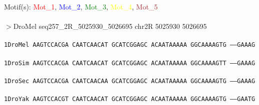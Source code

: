 \documentclass[11pt,twoside,reqno,a4paper]{article}
\begin{document}
\noindent
\newlength{\charwidth}Motif(s): \textcolor{Red}{Mot\_1}, \textcolor{Blue}{Mot\_2}, \textcolor{Green}{Mot\_3}, \textcolor{Yellow}{Mot\_4}, \textcolor{Brown}{Mot\_5}\\
\\
$>$DroMel	seq257\_2R\_5025930\_5026695	chr2R	5025930	5026695 \\
 \\
\texttt{1\hspace*{4\charwidth}DroMel	AAGTCCACGA	CAATCAACAT	GCATCGGAGC	ACAATAAAAA	GGCAAAAGTG	-----GAAAG	\\
\hspace*{5\charwidth}\hspace*{7\charwidth}\hspace*{1\charwidth}\hspace*{1\charwidth}\hspace*{1\charwidth}\hspace*{1\charwidth}\hspace*{1\charwidth}\hspace*{1\charwidth}\\
1\hspace*{4\charwidth}DroSim	AAGTCCACGA	CAATCAACAT	GCATCGGAGC	ACAATAAAAA	GGCAAAAGTT	-----GAAAG	\\
\hspace*{5\charwidth}\hspace*{7\charwidth}\hspace*{1\charwidth}\hspace*{1\charwidth}\hspace*{1\charwidth}\hspace*{1\charwidth}\hspace*{1\charwidth}\hspace*{1\charwidth}\\
1\hspace*{4\charwidth}DroSec	AAGTCCACGA	CAATCAACAA	GCATCGGAGC	ACAATAAAAA	GGCAAAAGTG	-----GAAAG	\\
\hspace*{5\charwidth}\hspace*{7\charwidth}\hspace*{1\charwidth}\hspace*{1\charwidth}\hspace*{1\charwidth}\hspace*{1\charwidth}\hspace*{1\charwidth}\hspace*{1\charwidth}\\
1\hspace*{4\charwidth}DroYak	AAGTCCACGT	CAATCAACAT	GCATCGGAGC	ACAATAAAAA	GGCAAAAGTG	-----GAATG	\\
}
\end{document}
